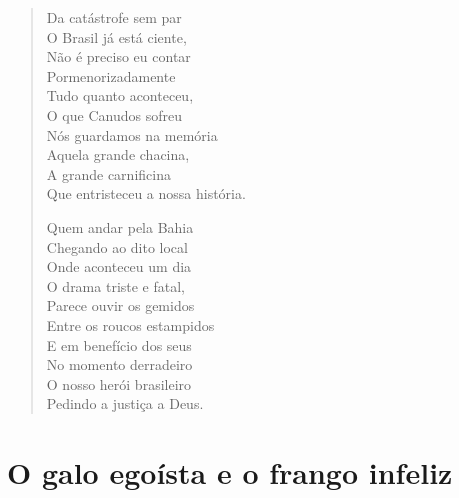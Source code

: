 \begin{verse}
Da catástrofe sem par\\
O Brasil já está ciente,\\
Não é preciso eu contar\\
Pormenorizadamente\\
Tudo quanto aconteceu,\\
O que Canudos sofreu\\
Nós guardamos na memória\\
Aquela grande chacina,\\
A grande carnificina\\
Que entristeceu a nossa história.

Quem andar pela Bahia\\
Chegando ao dito local\\
Onde aconteceu um dia\\
O drama triste e fatal,\\
Parece ouvir os gemidos\\
Entre os roucos estampidos\\
E em benefício dos seus\\
No momento derradeiro\\
O nosso herói brasileiro\\
Pedindo a justiça a Deus.
\end{verse}

\chapter{O galo egoísta e o frango infeliz}

